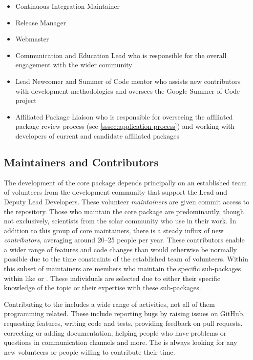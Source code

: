\begin{itemize}
    \item Continuous Integration Maintainer
    \item Release Manager
    \item Webmaster
    \item Communication and Education Lead who is responsible for the overall engagement with the wider community
    \item Lead Newcomer and Summer of Code mentor who assists new contributors with \sunpyproj development methodologies and oversees the Google Summer of Code project
    \item Affiliated Package Liaison who is responsible for overseeing the affiliated package review process (see \autoref{sssec:application-process}) and working with developers of current and candidate affiliated packages
\end{itemize}

\subsection{Maintainers and Contributors}
\label{ssec:maintainers-and-contributors}

The development of the \sunpypkg core package depends principally on an established team of volunteers from the development community that support the Lead and Deputy Lead Developers.
These volunteer \textit{maintainers} are given commit access to the \sunpypkg repository.
Those who maintain the \sunpypkg core package are predominantly, though not exclusively, scientists from the solar community who use \sunpypkg in their work.
In addition to this group of core maintainers, there is a steady influx of new \textit{contributors}, averaging around 20--25 people per year.
These contributors enable a wider range of features and code changes than would otherwise be normally possible due to the time constraints of the established team of volunteers.
Within this subset of maintainers are members who maintain the specific sub-packages within \sunpypkg like  or .
These individuals are selected due to either their specific knowledge of the topic or their expertise with these sub-packages.

Contributing to the \sunpyproj includes a wide range of activities, not all of them programming related.
These include reporting bugs by raising issues on GitHub, requesting features, writing code and tests, providing feedback on pull requests, correcting or adding documentation, helping people who have problems or questions in communication channels and more.
The \sunpyproj is always looking for any new volunteers or people willing to contribute their time.
